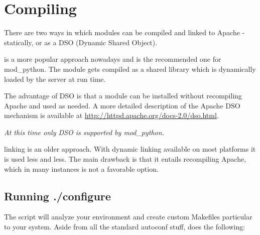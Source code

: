 \section{Compiling\label{inst-compiling}}

There are two ways in which modules can be compiled and linked to
Apache - statically, or as a DSO (Dynamic Shared Object).

 is a more popular approach nowadays and is the recommended
one for mod_python. The module gets compiled as a shared library which
is dynamically loaded by the server at run time.

The advantage of DSO is that a module can be installed without
recompiling Apache and used as needed.  A more detailed description of
the Apache DSO mechanism is available at
\url{http://httpd.apache.org/docs-2.0/dso.html}.

\emph{At this time only DSO is supported by mod_python.}

 linking is an older approach. With dynamic linking
available on most platforms it is used less and less. The main
drawback is that it entails recompiling Apache, which in many
instances is not a favorable option.

\subsection{Running ./configure\label{inst-configure}}

The  script will analyze your environment and create custom
Makefiles particular to your system. Aside from all the standard
autoconf stuff,  does the following:


